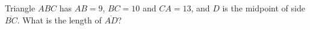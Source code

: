 Triangle $ABC$ has $AB=9$, $BC=10$ and $CA=13$, and $D$ is the midpoint of side $\overline{BC}$. What is the length of $\overline{AD}$?
